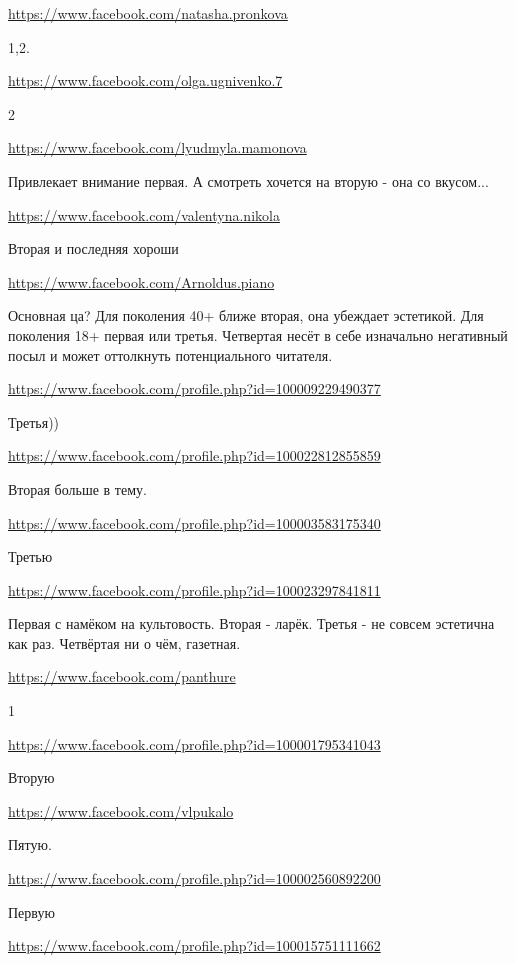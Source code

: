 \documentclass[a4paper,11pt]{extreport}
\begin{document}
\begin{itemize}
\url{https://www.facebook.com/natasha.pronkova}

1,2.

\url{https://www.facebook.com/olga.ugnivenko.7}

2

\url{https://www.facebook.com/lyudmyla.mamonova}

Привлекает внимание первая. А смотреть хочется на вторую - она со вкусом...

\url{https://www.facebook.com/valentyna.nikola}

Вторая и последняя хороши

\url{https://www.facebook.com/Arnoldus.piano}

Основная ца? Для поколения 40+ ближе вторая, она убеждает эстетикой. Для поколения 18+ первая или третья. Четвертая несёт в себе изначально негативный посыл и может оттолкнуть потенциального читателя.

\url{https://www.facebook.com/profile.php?id=100009229490377}

Третья))

\url{https://www.facebook.com/profile.php?id=100022812855859}

Вторая больше в тему.

\url{https://www.facebook.com/profile.php?id=100003583175340}

Третью

\url{https://www.facebook.com/profile.php?id=100023297841811}

Первая с намёком на культовость.
Вторая - ларёк.
Третья - не совсем эстетична как раз.
Четвёртая ни о чём, газетная.

\url{https://www.facebook.com/panthure}

1

\url{https://www.facebook.com/profile.php?id=100001795341043}

Вторую

\url{https://www.facebook.com/vlpukalo}

Пятую.

\url{https://www.facebook.com/profile.php?id=100002560892200}

Первую

\url{https://www.facebook.com/profile.php?id=100015751111662}


\end{itemize}
\end{document}
